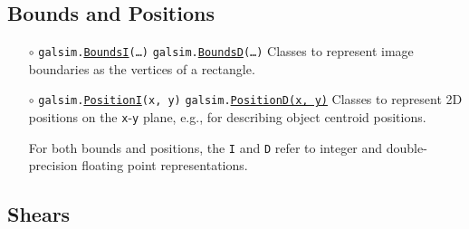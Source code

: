 \documentclass[preprint,10pt]{../../devel/modules/aastex}
\begin{document}
\subsection{Bounds and Positions}\label{sect:bounds}

\begin{itemize}

  \item[$\circ$] 
  \texttt{galsim.\href{http://galsim-developers.github.io/GalSim/classgalsim_1_1_bounds.html}{BoundsI}(\dots)} 
    \newline
    \texttt{galsim.\href{http://galsim-developers.github.io/GalSim/classgalsim_1_1_bounds.html}{BoundsD}(\dots)} 
    \newline 
    Classes to represent image boundaries as the vertices of a rectangle.

  \item[$\circ$] 
  \texttt{galsim.\href{http://galsim-developers.github.io/GalSim/classgalsim_1_1_position.html}{PositionI}(x, y)} 
    \newline
    \texttt{galsim.\href{http://galsim-developers.github.io/GalSim/classgalsim_1_1_position.html}{PositionD(x, y)}} 
    \newline 
    Classes to represent
    2D positions on the \texttt{x}-\texttt{y} plane, e.g., for describing object centroid
    positions.

For both bounds and positions, the \texttt{I} and \texttt{D} refer to
integer and double-precision floating point representations.

\end{itemize}

\subsection{Shears}\label{sect:shears}
\end{document}
